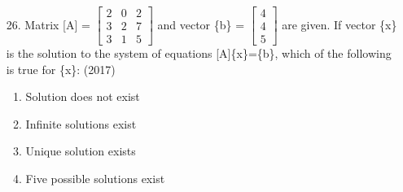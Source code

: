 \documentclass[journal]{IEEEtran}
\begin{document}
\begin{enumerate}
    \item[26.] Matrix [A] = $\begin{bmatrix} 2&0&2\\3&2&7\\3&1&5\end{bmatrix}$ and vector \{b\} = $\begin{bmatrix}4\\4\\5\end{bmatrix}$ are given. If vector \{x\} is the solution to the system of equations [A]\{x\}=\{b\}, which of the following is true for \{x\}: \hfill (2017)
    \begin{enumerate}[label=(\Alph*)]
        \item Solution does not exist
        \item Infinite solutions exist
        \item Unique solution exists 
        \item Five possible solutions exist 
    \end{enumerate} 
\end{enumerate}
\end{document}
